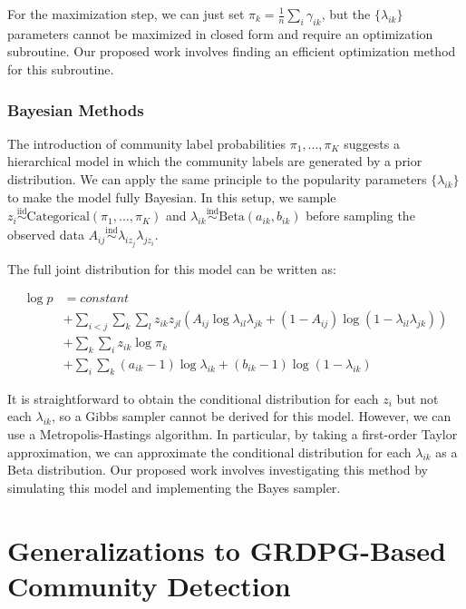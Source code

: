 \documentclass[
  11pt,
]{article}
\begin{document}
For the maximization step, we can just set
\(\pi_k = \frac{1}{n} \sum_i \gamma_{ik}\), but the \(\{\lambda_{ik}\}\)
parameters cannot be maximized in closed form and require an
optimization subroutine. Our proposed work involves finding an efficient
optimization method for this subroutine.

\hypertarget{bayesian-methods}{%
\subsubsection{Bayesian Methods}\label{bayesian-methods}}

The introduction of community label probabilities \(\pi_1, ..., \pi_K\)
suggests a hierarchical model in which the community labels are
generated by a prior distribution. We can apply the same principle to
the popularity parameters \(\{\lambda_{ik}\}\) to make the model fully
Bayesian. In this setup, we sample
\(z_i \stackrel{\text{iid}}{\sim}\text{Categorical}(\pi_1, ..., \pi_K)\)
and
\(\lambda_{ik} \stackrel{\text{ind}}{\sim}\text{Beta}(a_{ik}, b_{ik})\)
before sampling the observed data
\(A_{ij} \stackrel{\text{ind}}{\sim}\lambda_{i z_j} \lambda_{j z_i}\).

The full joint distribution for this model can be written as:

\[\begin{split}
\log p & = constant \\
& + \sum_{i < j} \sum_k \sum_l z_{ik} z_{jl} 
(A_{ij} \log \lambda_{il} \lambda_{jk} + 
(1 - A_{ij}) \log (1 - \lambda_{il} \lambda_{jk})) \\
& + \sum_k \sum_i z_{ik} \log \pi_k \\
& + \sum_i \sum_k (a_{ik} - 1) \log \lambda_{ik} + (b_{ik} - 1) \log (1 - \lambda_{ik})
\end{split}\]

It is straightforward to obtain the conditional distribution for each
\(z_i\) but not each \(\lambda_{ik}\), so a Gibbs sampler cannot be
derived for this model. However, we can use a Metropolis-Hastings
algorithm. In particular, by taking a first-order Taylor approximation,
we can approximate the conditional distribution for each
\(\lambda_{ik}\) as a Beta distribution. Our proposed work involves
investigating this method by simulating this model and implementing the
Bayes sampler.

\hypertarget{generalizations-to-grdpg-based-community-detection}{%
\section{Generalizations to GRDPG-Based Community
Detection}\label{generalizations-to-grdpg-based-community-detection}}
\end{document}
